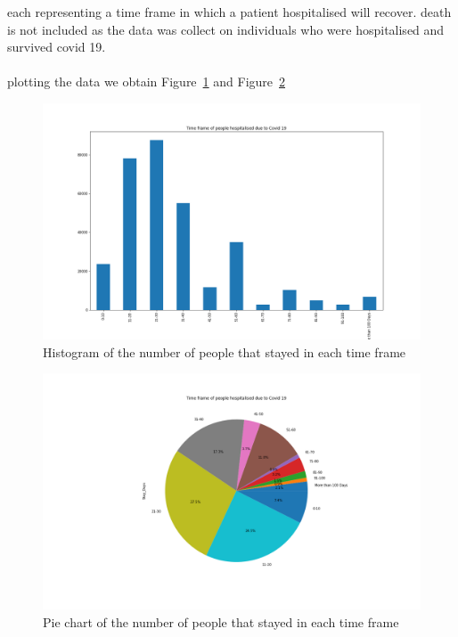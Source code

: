 \documentclass[fleqn]{article}
\begin{document}
			each representing a time frame in which a patient hospitalised will 					recover. death is not included as the data was collect on individuals 					who were hospitalised and survived covid 19.\\
			\\plotting the data we obtain Figure~\ref{fig:1} and Figure~\ref{fig:2}\\			
			\begin{figure}[hb]
  				\includegraphics[width=\linewidth]{clas_hist.png}
  				\caption{Histogram of the number of people that stayed in each time 						frame}
  			\label{fig:1}
			\end{figure}
			\FloatBarrier
			\begin{figure}[hb]
  				\includegraphics[width=\linewidth]{class_pie.png}
  				\caption{Pie chart of the number of people that stayed in each time 						frame}
  				\label{fig:2}
			\end{figure} 
			\FloatBarrier
			
\end{document}
